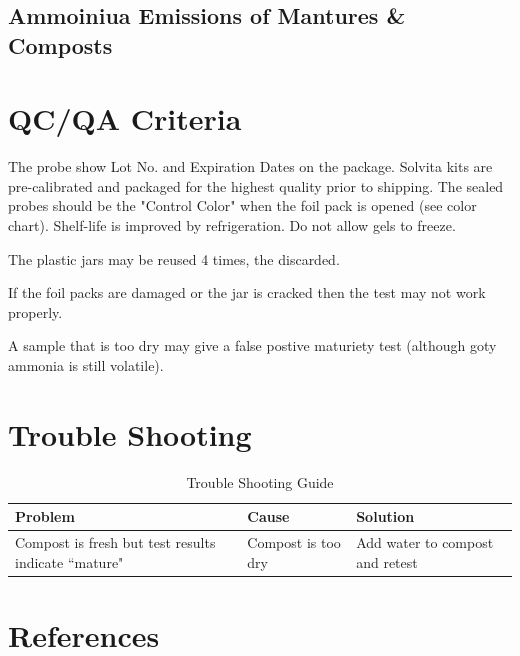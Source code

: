 \documentclass[12pt]{../SOP4_alpha}\usepackage[]{graphicx}\usepackage[]{xcolor}
\begin{document}
\subsection{Ammoiniua Emissions of Mantures \& Composts}

\section{QC/QA Criteria}

\NP The probe show Lot No. and Expiration Dates on the package. Solvita kits are pre-calibrated and packaged for the highest quality prior to shipping. The sealed probes should be the "Control Color" when the foil pack is opened (see color chart).  Shelf-life is improved by refrigeration. Do not allow gels to freeze. 

\NP The plastic jars may be reused 4 times, the discarded. 

\NP If the foil packs are damaged or the jar is cracked then the test may not work properly.

\NP A sample that is too dry may give a false postive maturiety test (although goty ammonia is still volatile).

\section{Trouble Shooting}

\begin{table}[ht]
\centering
\caption{Trouble Shooting Guide}
\begin{tabular}{p{5cm}p{5cm}p{5cm}} \hline
\textbf{Problem} & \textbf{Cause} & \textbf{Solution} \\ \hline \hline
Compost is fresh but test results indicate ``mature"& 
Compost is too dry & 
Add water to compost and retest \\


\end{tabular}
\end{table}

\section{References}




\end{document}
